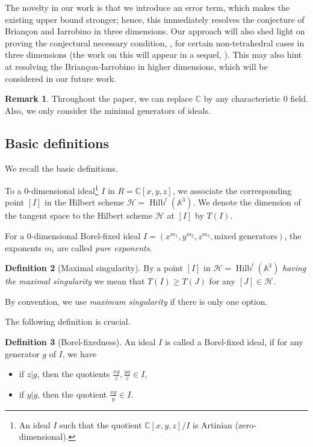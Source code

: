\documentclass[11pt,a4paper,leqno,noamsfonts]{amsart}
\numberwithin{equation}{section}
\newcommand{\BA}{{\mathbb{A}}}
\newcommand{\BC}{{\mathbb{C}}}
\newcommand{\CH}{{\mathcal H}}
\DeclareMathOperator{\Hilb}{Hilb}
\theoremstyle{definition}
\newtheorem{definition}{Definition}[section]
\newtheorem{remark}[definition]{Remark}
\theoremstyle{thm}
\theoremstyle{ex}
\theoremstyle{sol}
\begin{document}
The novelty in our work is that we introduce an error term, which makes the existing upper bound stronger; hence, this immediately resolves the conjecture of Brian\c{c}on and Iarrobino in three dimensions. Our approach will also shed light on proving the conjectural necessary condition, \cite[Conjecture B]{Rezaee-23-Conjectures}, for certain non-tetrahedral cases in three dimensions (the work on this will appear in a sequel, \cite{Mackenzie-Rezaee2}). {This may also hint at resolving the Brian\c{c}on-Iarrobino in higher dimensions, which will be considered in our future work.}







\begin{remark}
    Throughout the paper, we can replace $\BC$ by any characteristic $0$ field. Also, we only consider the minimal generators of ideals. 
\end{remark}


\subsection{Basic definitions} We recall the basic definitions.


To a $0$-dimensional ideal\footnote{An ideal $I$ such that the quotient $\BC[x,y,z]/I$ is Artinian (zero-dimensional).} $I$ in $R=\BC[x,y,z]$, we associate the corresponding point $[I]$ in the Hilbert scheme $\CH=\Hilb^l(\BA^3)$. We denote the dimension of the tangent space to the Hilbert scheme $\CH$ at $[I]$  by $T(I)$.



For a $0$-dimensional Borel-fixed ideal $I=(x^{m_1},y^{m_2},z^{m_3},\text{mixed generators})$, the exponents $m_i$ are called \emph{pure exponents}.

\begin{definition}[Maximal singularity]
    By a point $[I]$ in $\CH=\Hilb^l(\BA^3)$ \emph{having the maximal singularity} we mean that $T(I)\geq T(J)$ for any $[J]\in\CH$. 
    
    By convention, we use \emph{maximum singularity} if there is only one option.


\end{definition}

The following definition is crucial.

\begin{definition}[Borel-fixedness]\label{Def:Borel-fixedness} An ideal $I$ is called a Borel-fixed ideal,
if for any generator $g$ of $I$, we have 
\begin{itemize}
    \item if $z|g$, then the quotients $\frac{xg}{z}, \frac{yg}{z} \in I$, 
    \item if $y|g$, then the quotient  $\frac{xg}{y} \in I$. 
    \end{itemize}
\end{definition}
\end{document}
